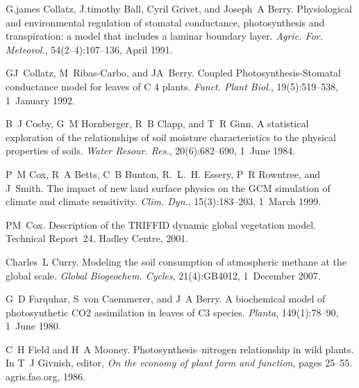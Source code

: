 \begin{DoxyDescription}
\item[\label{_CITEREF_Collatz1991-5bc}%
\mbox{[}16\mbox{]}]G.\+james Collatz, J.\+timothy Ball, Cyril Grivet, and Joseph~A Berry. Physiological and environmental regulation of stomatal conductance, photosynthesis and transpiration\+: a model that includes a laminar boundary layer. {\itshape Agric. For. Meteorol.}, 54(2–4)\+:107--136, April 1991. 


\item[\label{_CITEREF_Collatz1992-jf}%
\mbox{[}17\mbox{]}]G\+J~Collatz, M~Ribas-\/\+Carbo, and J\+A~Berry. Coupled Photosynthesis-\/\+Stomatal conductance model for leaves of C 4 plants. {\itshape Funct. Plant Biol.}, 19(5)\+:519--538, 1~January 1992. 


\item[\label{_CITEREF_Cosby1984-jc}%
\mbox{[}18\mbox{]}]B~J Cosby, G~M Hornberger, R~B Clapp, and T~R Ginn. A statistical exploration of the relationships of soil moisture characteristics to the physical properties of soils. {\itshape Water Resour. Res.}, 20(6)\+:682--690, 1~June 1984. 


\item[\label{_CITEREF_Cox1999-ia}%
\mbox{[}19\mbox{]}]P~M Cox, R~A Betts, C~B Bunton, R.~L.~H. Essery, P~R Rowntree, and J~Smith. The impact of new land surface physics on the G\+C\+M simulation of climate and climate sensitivity. {\itshape Clim. Dyn.}, 15(3)\+:183--203, 1~March 1999. 


\item[\label{_CITEREF_Cox2001-am}%
\mbox{[}20\mbox{]}]P\+M~Cox. Description of the T\+R\+I\+F\+F\+I\+D dynamic global vegetation model. Technical Report~24, Hadley Centre, 2001.


\item[\label{_CITEREF_Curry2007-du}%
\mbox{[}21\mbox{]}]Charles~L Curry. Modeling the soil consumption of atmospheric methane at the global scale. {\itshape Global Biogeochem. Cycles}, 21(4)\+:G\+B4012, 1~December 2007. 


\item[\label{_CITEREF_Farquhar1980-96e}%
\mbox{[}22\mbox{]}]G~D Farquhar, S~von Caemmerer, and J~A Berry. A biochemical model of photosynthetic C\+O2 assimilation in leaves of C3 species. {\itshape Planta}, 149(1)\+:78--90, 1~June 1980. 


\item[\label{_CITEREF_Field1986-kd}%
\mbox{[}23\mbox{]}]C~H Field and H~A Mooney. Photosynthesis--nitrogen relationship in wild plants. In T~J Givnish, editor, {\itshape On the economy of plant form and function}, pages 25--55. agris.\+fao.\+org, 1986.



\end{DoxyDescription}

